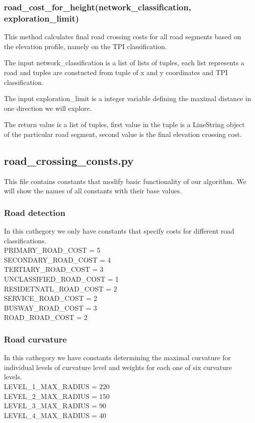 \documentclass[oneside]{article}
\begin{document}
            \subsubsection{road\_cost\_for\_height(network\_classification, exploration\_limit)}
            This method calculates final road crossing costs for all road segments based on the elevation profile, namely on the TPI classification.

            The input network\_classification is a list of lists of tuples, each list represents a road and tuples are constucted from tuple of x and y coordinates and TPI classification.

            The input exploration\_limit is a integer variable defining the maximal distance in one direction we will explore.

            The return value is a list of tuples, first value in the tuple is a LineString object of the particular road segment, second value is the final elevation crossing cost.

        \subsection{road\_crossing\_consts.py}
        This file contains constants that modify basic functionality of our algorithm. We will show the names of all constants with their base values.

            \subsubsection{Road detection}
            In this cathegory we only have constants that specify costs for different road classifications.\\
            PRIMARY\_ROAD\_COST = 5\\
            SECONDARY\_ROAD\_COST = 4\\
            TERTIARY\_ROAD\_COST = 3\\
            UNCLASSIFIED\_ROAD\_COST = 1\\
            RESIDETNATL\_ROAD\_COST = 2\\
            SERVICE\_ROAD\_COST = 2\\
            BUSWAY\_ROAD\_COST = 3\\
            ROAD\_ROAD\_COST = 2

            \subsubsection{Road curvature}
            In this cathegory we have constants determining the maximal curvature for individual levels of curvature level and weights for each one of six curvature levels.\\
            LEVEL\_1\_MAX\_RADIUS = 220\\
            LEVEL\_2\_MAX\_RADIUS = 150\\
            LEVEL\_3\_MAX\_RADIUS = 90\\
            LEVEL\_4\_MAX\_RADIUS = 40
\end{document}
